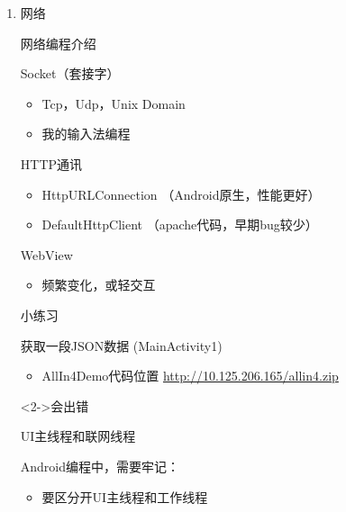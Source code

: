 \documentclass[presentation,dvipdfmx,CJKbookmarks]{beamer}
\begin{document}
\begin{CJK*}{UTF8}{simsun}
\begin{enumerate}
\begin{frame}[label={sec:org3ecba9c}]{yasnippet}
\begin{block}{另一个非常强大的补齐展开工具}
\end{block}
\begin{block}{用起来更正式，需要提前准备好展开脚本}
\end{block}
\end{frame}

\item 网络
\label{sec:orgc581fe0}
\begin{frame}[label={sec:org69d0895}]{网络编程介绍}
\begin{block}{Socket（套接字）}
\begin{itemize}
\item Tcp，Udp，Unix Domain
\item 我的输入法编程
\end{itemize}
\end{block}

\begin{block}{HTTP通讯}
\begin{itemize}
\item HttpURLConnection （Android原生，性能更好）
\item DefaultHttpClient （apache代码，早期bug较少）
\end{itemize}
\end{block}

\begin{block}{WebView}
\begin{itemize}
\item 频繁变化，或轻交互
\end{itemize}
\end{block}
\end{frame}


\begin{frame}[label={sec:orgfdcf4c1}]{小练习}
\begin{block}{获取一段JSON数据 (MainActivity1)}
\begin{itemize}
\item AllIn4Demo代码位置
\url{http://10.125.206.165/allin4.zip}
\end{itemize}
\end{block}
\begin{block}<2->{会出错}
\end{block}
\end{frame}
\begin{frame}[label={sec:orgb5780b6}]{UI主线程和联网线程}
\begin{block}{Android编程中，需要牢记：}
\begin{itemize}
\item 要区分开UI主线程和工作线程
\end{itemize}
\end{block}


\end{frame}
\end{enumerate}
\end{CJK*}
\end{document}
